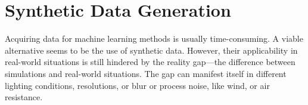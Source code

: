 
\section{Synthetic Data Generation}
\label{sec:syntheticdatageneration}

Acquiring data for machine learning methods is usually time-consuming. A viable alternative seems to be the 
use of synthetic data. However, their applicability in real-world situations is still hindered by
the reality gap---the difference between simulations and
real-world situations. The gap can manifest itself in different
lighting conditions, resolutions, or blur or process noise, like wind,
or air resistance.